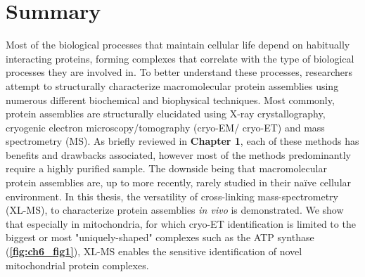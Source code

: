 \section{Summary}
Most of the biological processes that maintain cellular life depend on habitually interacting proteins, forming complexes that correlate with the type of biological processes they are involved in. To better understand these processes, researchers attempt to structurally characterize macromolecular protein assemblies using numerous different biochemical and biophysical techniques. Most commonly, protein assemblies are structurally elucidated using X-ray crystallography, cryogenic electron microscopy/tomography (cryo-EM/ cryo-ET) and mass spectrometry (MS). As briefly reviewed in \textbf{Chapter 1}, each of these methods has benefits and drawbacks associated, however most of the methods predominantly require a highly purified sample. The downside being that macromolecular protein assemblies are, up to more recently, rarely studied in their naïve cellular environment. In this thesis, the versatility of cross-linking mass-spectrometry (XL-MS), to characterize protein assemblies \emph{in vivo} is demonstrated. We show that especially in mitochondria, for which cryo-ET identification is limited to the biggest or most "uniquely-shaped" complexes \cite{RN1} such as the ATP synthase (\textbf{\autoref{fig:ch6_fig1}}), XL-MS enables the sensitive identification of novel mitochondrial protein complexes.

